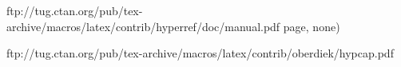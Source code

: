 ftp://tug.ctan.org/pub/tex-archive/macros/latex/contrib/hyperref/doc/manual.pdf
page, none)


ftp://tug.ctan.org/pub/tex-archive/macros/latex/contrib/oberdiek/hypcap.pdf

